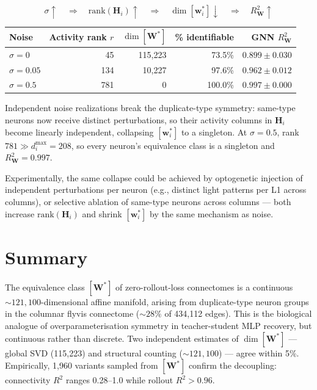 \documentclass[11pt,a4paper]{article}
\begin{document}
\begin{equation}
\sigma \uparrow \quad\Rightarrow\quad
\text{rank}(\mathbf{H}_i) \uparrow \quad\Rightarrow\quad
\dim[\mathbf{w}_i^*] \downarrow \quad\Rightarrow\quad
R^2_{\mathbf{W}} \uparrow
\end{equation}

\begin{center}
\begin{tabular}{lrrrr}
\toprule
Noise & Activity rank $r$ & $\dim[\mathbf{W}^*]$ & \% identifiable & GNN $R^2_{\mathbf{W}}$ \\
\midrule
$\sigma=0$    & 45  & 115,223 & 73.5\%  & $0.899\pm0.030$ \\
$\sigma=0.05$ & 134 & 10,227  & 97.6\%  & $0.962\pm0.012$ \\
$\sigma=0.5$  & 781 & 0       & 100.0\% & $0.997\pm0.000$ \\
\bottomrule
\end{tabular}
\end{center}

Independent noise realizations break the duplicate-type symmetry: same-type neurons
now receive distinct perturbations, so their activity columns in $\mathbf{H}_i$
become linearly independent, collapsing $[\mathbf{w}_i^*]$ to a singleton. At
$\sigma=0.5$, rank $781 \gg d_i^{\max} = 208$, so every neuron's equivalence class
is a singleton and $R^2_{\mathbf{W}} = 0.997$.

Experimentally, the same collapse could be achieved by optogenetic injection of
independent perturbations per neuron (e.g., distinct light patterns per L1 across
columns), or selective ablation of same-type neurons across columns --- both
increase $\text{rank}(\mathbf{H}_i)$ and shrink $[\mathbf{w}_i^*]$ by the same
mechanism as noise.

\section{Summary}

The equivalence class $[\mathbf{W}^*]$ of zero-rollout-loss connectomes is a
continuous $\sim 121{,}100$-dimensional affine manifold, arising from
duplicate-type neuron groups in the columnar flyvis connectome ($\sim 28\%$ of
434,112 edges). This is the biological analogue of overparameterisation symmetry
in teacher-student MLP recovery, but continuous rather than discrete. Two
independent estimates of $\dim[\mathbf{W}^*]$ --- global SVD (115,223) and
structural counting ($\sim 121{,}100$) --- agree within 5\%. Empirically, 1,960
variants sampled from $[\mathbf{W}^*]$ confirm the decoupling: connectivity $R^2$
ranges 0.28--1.0 while rollout $R^2 > 0.96$.
\end{document}

